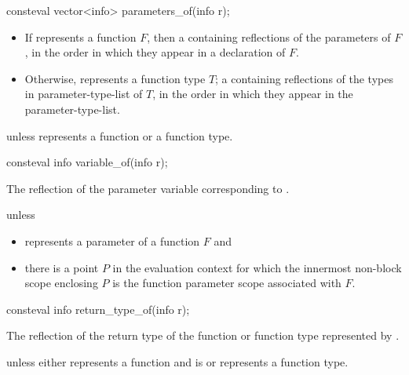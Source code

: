 %
\begin{itemdecl}
consteval vector<info> parameters_of(info r);
\end{itemdecl}

\begin{itemdescr}
\pnum
\returns
\begin{itemize}
\item
  If  represents a function $F$,
  then a  containing reflections of the parameters of $F$,
  in the order in which they appear in a declaration of $F$.
\item
  Otherwise,  represents a function type $T$;
  a  containing reflections of the types
  in parameter-type-list of $T$,
  in the order in which they appear in the parameter-type-list.
\end{itemize}

\pnum
\throws
{} unless
 represents a function or a function type.
\end{itemdescr}

%
\begin{itemdecl}
consteval info variable_of(info r);
\end{itemdecl}

\begin{itemdescr}
\pnum
\returns
The reflection of the parameter variable corresponding to .

\pnum
\throws
{} unless
\begin{itemize}
\item
   represents a parameter of a function $F$ and
\item
  there is a point $P$ in the evaluation context
  for which the innermost non-block scope enclosing $P$
  is the function parameter scope
  associated with $F$.
\end{itemize}
\end{itemdescr}

%
\begin{itemdecl}
consteval info return_type_of(info r);
\end{itemdecl}

\begin{itemdescr}
\pnum
\returns
The reflection of the return type
of the function or function type represented by .

\pnum
\throws
{} unless
either  represents a function
and  is 
or  represents a function type.
\end{itemdescr}

